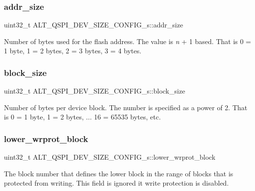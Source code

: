 \subsubsection{\texorpdfstring{addr\_size}{addr\_size}}
{\footnotesize\ttfamily uint32\+\_\+t A\+L\+T\+\_\+\+Q\+S\+P\+I\+\_\+\+D\+E\+V\+\_\+\+S\+I\+Z\+E\+\_\+\+C\+O\+N\+F\+I\+G\+\_\+s\+::addr\+\_\+size}

Number of bytes used for the flash address. The value is {\itshape n} + 1 based. That is 0 = 1 byte, 1 = 2 bytes, 2 = 3 bytes, 3 = 4 bytes. \mbox{\label{structALT__QSPI__DEV__SIZE__CONFIG__s_ac380464f9d02e4af3cb70053498615e4}} 
\subsubsection{\texorpdfstring{block\_size}{block\_size}}
{\footnotesize\ttfamily uint32\+\_\+t A\+L\+T\+\_\+\+Q\+S\+P\+I\+\_\+\+D\+E\+V\+\_\+\+S\+I\+Z\+E\+\_\+\+C\+O\+N\+F\+I\+G\+\_\+s\+::block\+\_\+size}

Number of bytes per device block. The number is specified as a power of 2. That is 0 = 1 byte, 1 = 2 bytes, ... 16 = 65535 bytes, etc. \mbox{\label{structALT__QSPI__DEV__SIZE__CONFIG__s_a8b5117840e5e442b94ffe611d189ab92}} 
\subsubsection{\texorpdfstring{lower\_wrprot\_block}{lower\_wrprot\_block}}
{\footnotesize\ttfamily uint32\+\_\+t A\+L\+T\+\_\+\+Q\+S\+P\+I\+\_\+\+D\+E\+V\+\_\+\+S\+I\+Z\+E\+\_\+\+C\+O\+N\+F\+I\+G\+\_\+s\+::lower\+\_\+wrprot\+\_\+block}

The block number that defines the lower block in the range of blocks that is protected from writing. This field is ignored it write protection is disabled. \mbox{\label{structALT__QSPI__DEV__SIZE__CONFIG__s_a8aad79e92570e836f362f94908639f05}} 
